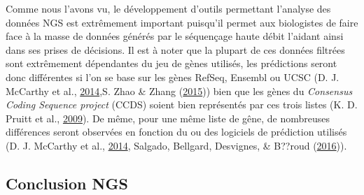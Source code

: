 \documentclass[12pt,twoside]{reedthesis}
\theoremstyle{definition}
\theoremstyle{definition}
\theoremstyle{remark}
\begin{document}
  Comme nous l'avons vu, le développement d'outils permettant l'analyse
  des données NGS est extrêmement important puisqu'il permet aux
  biologistes de faire face à la masse de données générés par le
  séquençage haute débit l'aidant ainsi dans ses prises de décisions. Il
  est à noter que la plupart de ces données filtrées sont extrêmement
  dépendantes du jeu de gènes utilisés, les prédictions seront donc
  différentes si l'on se base sur les gènes RefSeq, Ensembl ou UCSC (D. J.
  McCarthy et al., \protect\hyperlink{ref-McCarthy2014}{2014},S. Zhao \&
  Zhang (\protect\hyperlink{ref-Zhao2015}{2015})) bien que les gènes du
  \emph{Consensus Coding Sequence project} (CCDS) soient bien représentés
  par ces trois listes (K. D. Pruitt et al.,
  \protect\hyperlink{ref-Pruitt2009}{2009}). De même, pour une même liste
  de gêne, de nombreuses différences seront observées en fonction du ou
  des logiciels de prédiction utilisés (D. J. McCarthy et al.,
  \protect\hyperlink{ref-McCarthy2014}{2014}, Salgado, Bellgard,
  Desvignes, \& B??roud (\protect\hyperlink{ref-Salgado2016}{2016})).
  
  \subsection{Conclusion NGS}\label{conclusion-ngs}
  
\end{document}
